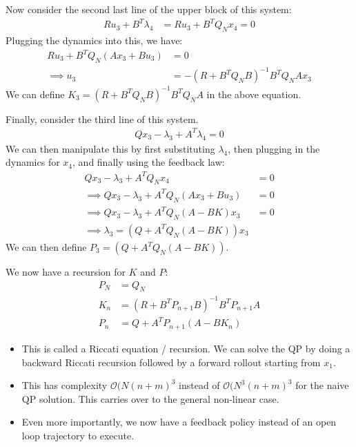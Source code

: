 \noindent
Now consider the second last line of the upper block of this system:
\begin{align}
    R u_3 + B^T \lambda_4 &= R u_3 + B^T Q_N x_4 = 0 
\end{align}
Plugging the dynamics into this, we have: 
\begin{align}
    R u_3 + B^T Q_N (A x_3 + B u_3) &= 0 \\
    \implies u_3 &= - (R + B^T Q_N B )^{-1} B^T Q_N A x_3
\end{align}
We can define $K_3 = (R + B^T Q_N B )^{-1} B^T Q_N A$ in the above equation. 

\noindent
Finally, consider the third line of this system. 
\begin{align}
    Q x_3 - \lambda_3 + A^T \lambda_4 = 0
\end{align}
We can then manipulate this by first substituting $\lambda_4$, then plugging in the dynamics for $x_4$, and finally using the feedback law:
\begin{align}
    Q x_3 - \lambda_3 + A^T Q_N x_4 &= 0 \\
    \implies Q x_3 - \lambda_3 + A^T Q_N (A x_3 + B u_3) &= 0 \\
    \implies Q x_3 - \lambda_3 + A^T Q_N (A - B K) x_3 &= 0 \\
    \implies \lambda_3 = (Q + A^T Q_N (A- BK)) x_3
\end{align}
We can then define $P_3 =  (Q + A^T Q_N (A- BK))$. 

\noindent
We now have a recursion for $K$ and $P$: 
\begin{align}
    P_N &= Q_N \\
    K_n &= (R + B^T P_{n+1} B)^{-1} B^T P_{n+1} A \\
    P_n &= Q + A^T P_{n+1} (A - BK_n)
\end{align}

\begin{itemize}
    \item This is called a Riccati equation / recursion.
    \itm We can solve the QP by doing a backward Riccati recursion followed by a forward rollout starting from $x_1$.
    \item This has complexity $\mathcal{O} (N (n+m)^3$ instead of $\mathcal{O} (N^3 (n+m)^3$ for the naive QP solution. 
    This carries over to the general non-linear case. 
    \item Even more importantly, we now have a feedback policy instead of an open loop trajectory to execute. 
\end{itemize}

